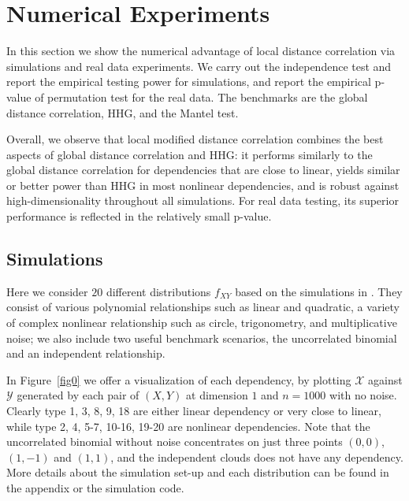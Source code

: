 \documentclass[11pt]{article}
\begin{document}
\section{Numerical Experiments}
\label{numer}
In this section we show the numerical advantage of local distance correlation via simulations and real data experiments. We carry out the independence test and report the empirical testing power for simulations, and report the empirical p-value of permutation test for the real data. The benchmarks are the global distance correlation, HHG, and the Mantel test. 

Overall, we observe that local modified distance correlation combines the best aspects of global distance correlation and HHG: it performs similarly to the global distance correlation for dependencies that are close to linear, yields similar or better power than HHG in most nonlinear dependencies, and is robust against high-dimensionality throughout all simulations. For real data testing, its superior performance is reflected in the relatively small p-value.

\subsection{Simulations}
\label{numer1}
Here we consider $20$ different distributions $f_{XY}$ based on the simulations in \cite{SzekelyRizzoBakirov2007, SimonTibshirani2012, GorfineHellerHeller2012, HellerGorfine2013}. They consist of various polynomial relationships such as linear and quadratic, a variety of complex nonlinear relationship such as circle, trigonometry, and multiplicative noise; we also include two useful benchmark scenarios, the uncorrelated binomial and an independent relationship. 

In Figure~\ref{fig0} we offer a visualization of each dependency, by plotting $\mathcal{X}$ against $\mathcal{Y}$ generated by each pair of $(X,Y)$ at dimension $1$ and $n=1000$ with no noise. Clearly type 1, 3, 8, 9, 18 are either linear dependency or very close to linear, while type 2, 4, 5-7, 10-16, 19-20 are nonlinear dependencies. Note that the uncorrelated binomial without noise concentrates on just three points $(0,0)$, $(1,-1)$ and $(1,1)$, and the independent clouds does not have any dependency. More details about the simulation set-up and each distribution can be found in the appendix or the simulation code.
\end{document}

